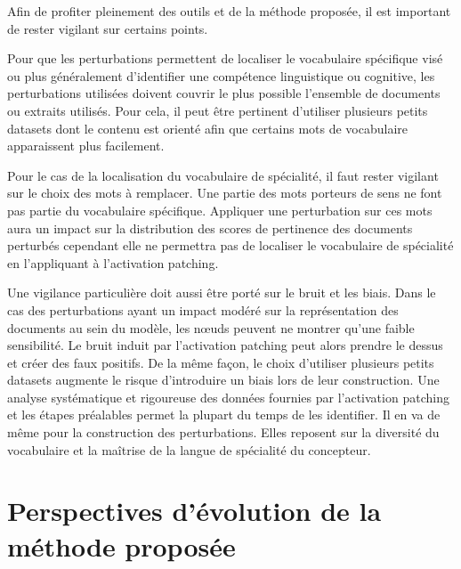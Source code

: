         Afin de profiter pleinement des outils et de la méthode proposée, il est important de rester vigilant sur certains points.

        Pour que les perturbations permettent de localiser le vocabulaire spécifique visé ou plus généralement d'identifier une compétence linguistique ou cognitive, les perturbations utilisées doivent couvrir le plus possible l'ensemble de documents ou extraits utilisés. Pour cela, il peut être pertinent d'utiliser plusieurs petits datasets dont le contenu est orienté afin que certains mots de vocabulaire apparaissent plus facilement. 

        Pour le cas de la localisation du vocabulaire de spécialité, il faut rester vigilant sur le choix des mots à remplacer. Une  partie des mots porteurs de sens ne font pas partie du vocabulaire spécifique. Appliquer une perturbation sur ces mots aura un impact sur la distribution des scores de pertinence des documents perturbés cependant elle ne permettra pas de localiser le vocabulaire de spécialité en l'appliquant à l'activation patching.

        Une vigilance particulière doit aussi être porté sur le bruit et les biais. Dans le cas des perturbations ayant un impact modéré sur la représentation des documents au sein du modèle, les nœuds peuvent ne montrer qu'une faible sensibilité. Le bruit induit par l'activation patching peut alors prendre le dessus et créer des faux positifs.  De la même façon, le choix d'utiliser plusieurs petits datasets augmente le risque d'introduire un biais lors de leur construction. Une analyse systématique et rigoureuse des données fournies par l'activation patching et les étapes préalables permet la plupart du temps de les identifier. Il en va de même pour la construction des perturbations. Elles reposent sur la diversité du vocabulaire et la maîtrise de la langue de spécialité du concepteur.


\section{Perspectives d'évolution de la méthode proposée}



